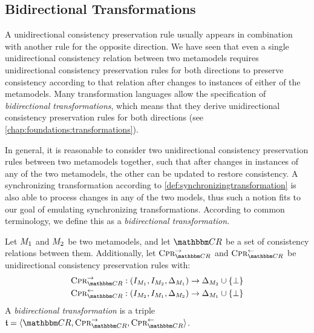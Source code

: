 \subsection{Bidirectional Transformations}

A unidirectional consistency preservation rule usually appears in combination with another rule for the opposite direction.
We have seen that even a single unidirectional consistency relation between two metamodels requires unidirectional consistency preservation rules for both directions to preserve consistency according to that relation after changes to instances of either of the metamodels.
Many transformation languages allow the specification of \emph{bidirectional transformations}, which means that they derive unidirectional consistency preservation rules for both directions (see \autoref{chap:foundations:transformations}).

In general, it is reasonable to consider two unidirectional consistency preservation rules between two metamodels together, such that after changes in instances of any of the two metamodels, the other can be updated to restore consistency.
A synchronizing transformation according to \autoref{def:synchronizingtransformation} is also able to process changes in any of the two models, thus such a notion fits to our goal of emulating synchronizing transformations.
According to common terminology, we define this as a \emph{bidirectional transformation}.

\begin{definition}
    \label{def:bidirectionaltransformation}
    Let $\metamodel{M}{1}$ and $\metamodel{M}{2}$ be two metamodels, and let $\consistencyrelationset{CR}$ be a set of consistency relations between them.
    Additionally, let $\consistencypreservationrule{\consistencyrelationset{CR}}^{\rightarrow}$ and $\consistencypreservationrule{\consistencyrelationset{CR}}^{\leftarrow}$ be unidirectional consistency preservation rules with:
    \begin{align*}
        &
        \consistencypreservationrule{\consistencyrelationset{CR}}^{\rightarrow} : (\metamodelinstanceset{M}{1}, \metamodelinstanceset{M}{2}, \changeuniverse{\metamodel{M}{1}}) \rightarrow \changeuniverse{\metamodel{M}{2}} \cup \setted{\bot} \\
        &
        \consistencypreservationrule{\consistencyrelationset{CR}}^{\leftarrow} : (\metamodelinstanceset{M}{2}, \metamodelinstanceset{M}{1}, \changeuniverse{\metamodel{M}{2}}) \rightarrow \changeuniverse{\metamodel{M}{1}} \cup \setted{\bot}
    \end{align*}
    A \emph{bidirectional transformation} is a triple $\transformation{t} = \tupled{\consistencyrelationset{CR},\consistencypreservationrule{\consistencyrelationset{CR}}^{\rightarrow}, \consistencypreservationrule{\consistencyrelationset{CR}}^{\leftarrow}}$.
\end{definition}

